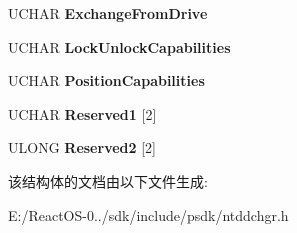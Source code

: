 \begin{DoxyCompactItemize}
U\+C\+H\+AR {\bfseries Exchange\+From\+Drive}
\item 
\mbox{\label{struct___g_e_t___c_h_a_n_g_e_r___p_a_r_a_m_e_t_e_r_s_a7241768da12482f1c4931c21f3789896}} 
U\+C\+H\+AR {\bfseries Lock\+Unlock\+Capabilities}
\item 
\mbox{\label{struct___g_e_t___c_h_a_n_g_e_r___p_a_r_a_m_e_t_e_r_s_a7d42b8e6383d002491cab82ed1f6f91a}} 
U\+C\+H\+AR {\bfseries Position\+Capabilities}
\item 
\mbox{\label{struct___g_e_t___c_h_a_n_g_e_r___p_a_r_a_m_e_t_e_r_s_a255d523df85ecab94be7090c0f6106f3}} 
U\+C\+H\+AR {\bfseries Reserved1} \mbox{[}2\mbox{]}
\item 
\mbox{\label{struct___g_e_t___c_h_a_n_g_e_r___p_a_r_a_m_e_t_e_r_s_a05e2989c4e61bd7195c82436cd623070}} 
U\+L\+O\+NG {\bfseries Reserved2} \mbox{[}2\mbox{]}
\end{DoxyCompactItemize}


该结构体的文档由以下文件生成\+:\begin{DoxyCompactItemize}
\item 
E\+:/\+React\+O\+S-\/0../sdk/include/psdk/ntddchgr.\+h\end{DoxyCompactItemize}
